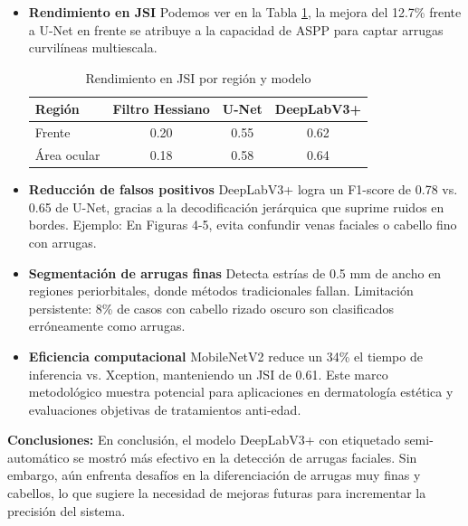 \begin{itemize}
    \item \textbf{Rendimiento en JSI}
	Podemos ver en la Tabla \ref{tab:jsi_performance}, la mejora del 12.7\% frente a U-Net en frente se atribuye a la capacidad de ASPP para captar arrugas curvilíneas multiescala.
	
	\begin{table}[H]
		\centering
		\caption{Rendimiento en JSI por región y modelo}
		\renewcommand{\arraystretch}{1.2} %
		\setlength{\tabcolsep}{5pt} %
		\begin{tabularx}{\textwidth}{@{}X c c c@{}}
			\toprule
			\textbf{Región} & \textbf{Filtro Hessiano} & \textbf{U-Net} & \textbf{DeepLabV3+} \\
			\midrule
			Frente & 0.20 & 0.55 & 0.62 \\
			Área ocular & 0.18 & 0.58 & 0.64 \\
			\bottomrule
		\end{tabularx}
		\label{tab:jsi_performance}
	\end{table}


	\item \textbf{Reducción de falsos positivos}
	DeepLabV3+ logra un F1-score de 0.78 vs. 0.65 de U-Net, gracias a la decodificación jerárquica que suprime ruidos en bordes.
	Ejemplo: En Figuras 4-5, evita confundir venas faciales o cabello fino con arrugas.
	
	\item \textbf{Segmentación de arrugas finas}
	Detecta estrías de 0.5 mm de ancho en regiones periorbitales, donde métodos tradicionales fallan.
	Limitación persistente: 8\% de casos con cabello rizado oscuro son clasificados erróneamente como arrugas.
	
	\item \textbf{Eficiencia computacional}
MobileNetV2 reduce un 34\% el tiempo de inferencia vs. Xception, manteniendo un JSI de 0.61.
Este marco metodológico muestra potencial para aplicaciones en dermatología estética y evaluaciones objetivas de tratamientos anti-edad.
\end{itemize}

\textbf{Conclusiones:}
En conclusión, el modelo DeepLabV3+ con etiquetado semi-automático se mostró más efectivo en la detección de arrugas faciales. Sin embargo, aún enfrenta desafíos en la diferenciación de arrugas muy finas y cabellos, lo que sugiere la necesidad de mejoras futuras para incrementar la precisión del sistema.


